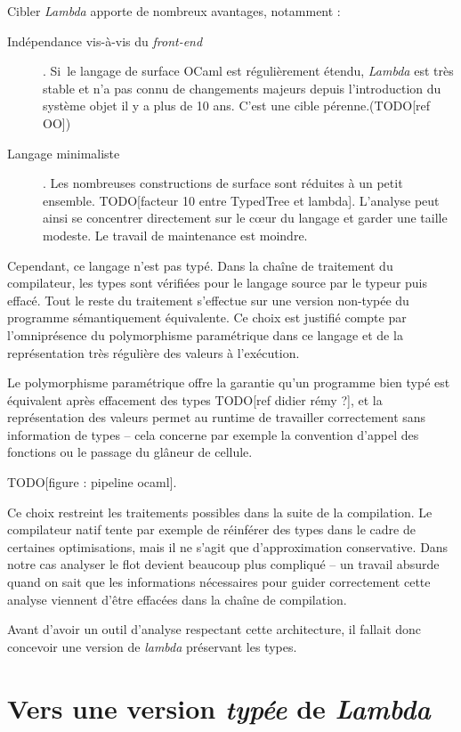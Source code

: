 \documentclass[12pt]{report}
\newcommand\todo[1]{TODO[#1]}
\begin{document}
Cibler \emph{Lambda} apporte de nombreux avantages, notamment :
\begin{description}
  \item[Indépendance vis-à-vis du \emph{front-end}]. Si le langage de surface
    OCaml est régulièrement étendu, \emph{Lambda} est très stable et n'a pas
    connu de changements majeurs depuis l'introduction du système objet il y a
    plus de 10 ans. C'est une cible pérenne.(\todo{ref OO})
  \item[Langage minimaliste].
    Les nombreuses constructions de surface sont réduites à un petit ensemble.
    \todo{facteur 10 entre TypedTree et lambda}.
    L'analyse peut ainsi se concentrer directement sur le cœur du langage et
    garder une taille modeste. Le travail de maintenance est moindre.
\end{description}

Cependant, ce langage n'est pas typé. Dans la chaîne de traitement du
compilateur, les types sont vérifiées pour le langage source par le typeur puis
effacé. Tout le reste du traitement s'effectue sur une version non-typée du
programme sémantiquement équivalente. Ce choix est justifié compte par
l'omniprésence du polymorphisme paramétrique dans ce langage et de la
représentation très régulière des valeurs à l'exécution.

Le polymorphisme paramétrique offre la garantie qu'un programme bien typé est
équivalent après effacement des types \todo{ref didier rémy ?}, et la
représentation des valeurs permet au runtime de travailler correctement sans
information de types -- cela concerne par exemple la convention d'appel des
fonctions ou le passage du glâneur de cellule.

\todo{figure : pipeline ocaml}.

Ce choix restreint les traitements possibles dans la suite de la compilation.
Le compilateur natif tente par exemple de réinférer des types dans le cadre
de certaines optimisations, mais il ne s'agit que d'approximation conservative.  
Dans notre cas analyser le flot devient beaucoup plus compliqué -- un travail
absurde quand on sait que les informations nécessaires pour guider
correctement cette analyse viennent d'être effacées dans la chaîne de
compilation.

Avant d'avoir un outil d'analyse respectant cette architecture, il fallait donc
concevoir une version de \emph{lambda} préservant les types.

\section{Vers une version \emph{typée} de \emph{Lambda}}
\end{document}
